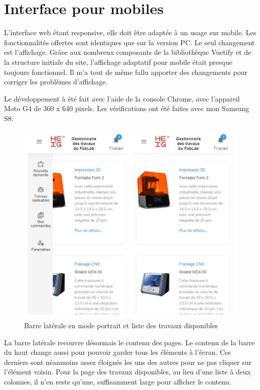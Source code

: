 \documentclass[
    iai, %
    eai, %
]{heig-tb}
\begin{document}
\newpage
\section{Interface pour mobiles}
L'interface web étant responsive, elle doit être adaptée à un usage sur mobile. Les fonctionnalités offertes sont identiques que sur la version PC. Le seul changement est l'affichage.
Grâce aux nombreux composants de la bibliothèque Vuetify et de la structure initiale du site, l'affichage adaptatif pour mobile était presque toujours fonctionnel. Il m'a tout de même fallu apporter des changements pour corriger les problèmes d'affichage.

Le développement à été fait avec l'aide de la console Chrome, avec l'appareil Moto G4 de 360 x 640 pixels. Les vérifications ont été faites avec mon Samsung S8.

\begin{figure}[h]
  \centering
  \includegraphics[width=12cm]{ui_mobile_joblist_portrait.PNG}
  \caption{Barre latérale en mode portrait et liste des travaux disponibles}
\end{figure}

La barre latérale recouvre désormais le contenu des pages. Le contenu de la barre du haut change aussi pour pouvoir garder tous les éléments à l'écran. Ces derniers sont néanmoins assez éloignés les uns des autres pour ne pas cliquer sur l'élément voisin.
Pour la page des travaux disponibles, au lieu d'une liste à deux colonnes, il n'en reste qu'une, suffisamment large pour afficher le contenu.
\end{document}
